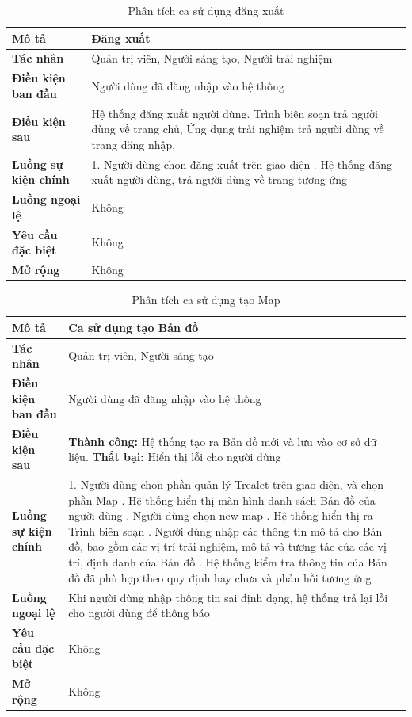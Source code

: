 \begin{table}
\centering
\caption{Phân tích ca sử dụng đăng xuất}
\begin{tabular}{|p{4cm}|p{10cm}|}
    \hline
\textbf{Mô tả} & Đăng xuất \\ \hline
\textbf{Tác nhân} & Quản trị viên, Người sáng tạo, Người trải nghiệm \\ \hline
\textbf{Điều kiện ban đầu} & Người dùng đã đăng nhập vào hệ thống \\ \hline
\textbf{Điều kiện sau} & Hệ thống đăng xuất người dùng. Trình biên soạn trả người dùng về trang chủ, Ứng dụng trải nghiệm trả người dùng về trang đăng nhập. \\ \hline
\textbf{Luồng sự kiện chính} & 
1. Người dùng chọn đăng xuất trên
giao diện \newline
2. Hệ thống đăng xuất người dùng,
trả người dùng về trang tương
ứng \\ \hline
\textbf{Luồng ngoại lệ} & Không \\ \hline
\textbf{Yêu cầu đặc biệt} & Không \\ \hline
\textbf{Mở rộng} & Không \\ \hline
\end{tabular}
\end{table}
\begin{table}
\centering
\caption{Phân tích ca sử dụng tạo Map}
\begin{tabular}{|p{4cm}|p{10cm}|}
    \hline
\textbf{Mô tả} & Ca sử dụng tạo Bản đồ \\ \hline
\textbf{Tác nhân} & Quản trị viên, Người sáng tạo \\ \hline
\textbf{Điều kiện ban đầu} & Người dùng đã đăng nhập vào hệ thống \\ \hline
\textbf{Điều kiện sau} & 
\textbf{Thành công:} Hệ thống tạo ra Bản đồ mới và lưu vào cơ sở dữ liệu. \newline
\textbf{Thất bại:} Hiển thị lỗi cho người dùng \\ \hline
\textbf{Luồng sự kiện chính} & 
1. Người dùng chọn phần quản lý
Trealet trên giao diện, và chọn
phần Map \newline
2. Hệ thống hiển thị màn hình danh
sách Bản đồ của người dùng \newline
3. Người dùng chọn new map \newline
4. Hệ thống hiển thị ra Trình
biên soạn \newline
5. Người dùng nhập các thông tin
mô tả cho Bản đồ, bao gồm các vị
trí trải nghiệm, mô tả và tương tác
của các vị trí, định danh của Bản
đồ \newline
6. Hệ thống kiểm tra thông tin của
Bản đồ đã phù hợp theo quy định
hay chưa và phản hồi tương ứng \\ \hline
\textbf{Luồng ngoại lệ} & Khi người dùng nhập thông tin sai định dạng, hệ thống trả lại lỗi cho người dùng để thông báo \\ \hline
\textbf{Yêu cầu đặc biệt} & Không \\ \hline
\textbf{Mở rộng} & Không \\ \hline
\end{tabular}
\end{table}

